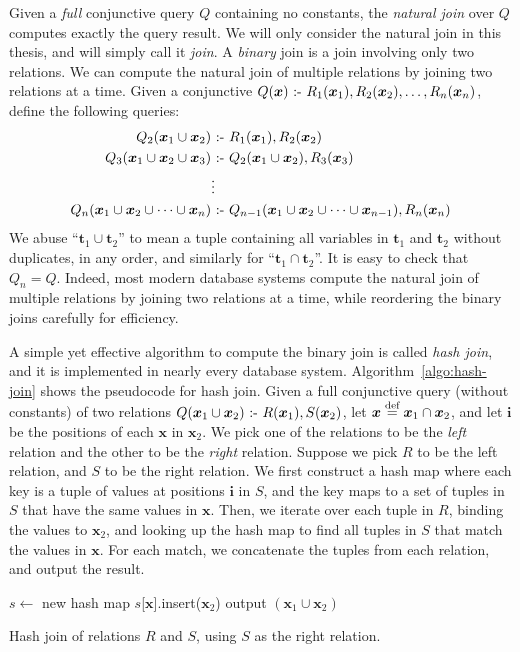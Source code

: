 Given a {\em full} conjunctive query $Q$ containing no constants, 
 the {\em natural join} over $Q$ computes exactly the query result.
We will only consider the natural join in this thesis, 
 and will simply call it {\em join}.
A {\em binary} join is a join involving only two relations.
We can compute the natural join of multiple relations 
 by joining two relations at a time.
Given a conjunctive $Q(\bm{x}) \text{ :- } R_1(\bm{x}_1), R_2(\bm{x}_2), \ldots, R_n(\bm{x}_n)$,
 define the following queries:
\begin{align*}
Q_2({\bm x_1} \cup {\bm x_2}) &\text{ :- } R_1({\bm x_1}), R_2({\bm x_2})\\
Q_3({\bm x_1} \cup {\bm x_2} \cup {\bm x_3}) &\text{ :- } Q_2({\bm x_1} \cup {\bm x_2}), R_3({\bm x_3})\\
& \vdots \\
Q_n({\bm x_1} \cup {\bm x_2} \cup \cdots \cup {\bm x_n}) &\text{ :- } Q_{n-1}({\bm x_1} \cup {\bm x_2} \cup \cdots \cup {\bm x_{n-1}}), R_n({\bm x_n})
\end{align*}
We abuse ``${\bm t_1} \cup {\bm t_2}$'' to mean a tuple containing 
 all variables in ${\bm t_1}$ and ${\bm t_2}$ without duplicates, in any order, 
 and similarly for ``${\bm t_1} \cap {\bm t_2}$''.
It is easy to check that $Q_n = Q$. 
Indeed, most modern database systems compute the natural join of multiple relations 
 by joining two relations at a time, 
 while reordering the binary joins carefully for efficiency. 

A simple yet effective algorithm to compute the binary join is called {\em hash join},
 and it is implemented in nearly every database system.
Algorithm~\ref{algo:hash-join} shows the pseudocode for hash join.
Given a full conjunctive query (without constants) 
 of two relations $Q({\bm x_1} \cup {\bm x_2}) \text{ :- } R({\bm x_1}), S({\bm x_2})$,
 let ${\bm x} \stackrel{\text{def}}{=} {\bm x_1} \cap {\bm x_2}$,
 and let ${\bm i}$ be the positions of each ${\bm x}$ in ${\bm x_2}$.
We pick one of the relations to be the {\em left} relation and the other to be the {\em right} relation.
Suppose we pick $R$ to be the left relation, and $S$ to be the right relation.
We first construct a hash map where each key is a tuple of values at positions ${\bm i}$ in $S$,
 and the key maps to a set of tuples in $S$ that have the same values in ${\bm x}$.
Then, we iterate over each tuple in $R$,
 binding the values to ${\bm x_2}$,
 and looking up the hash map to find all tuples in $S$ that match the values in ${\bm x}$.
For each match, we concatenate the tuples from each relation,
 and output the result.
%
\begin{algorithm}[th]
    $s \gets$ new hash map\;
    {
        $s$[${\bm x}$].insert(${\bm x_2}$)\;
    }
    {
        {
            output $({\bm x_1}\cup {\bm x_2})$\;
        }
    }
    \caption{Hash join of relations $R$ and $S$, using $S$ as the right relation.}
    \label{algo:hash-join}
\end{algorithm}


